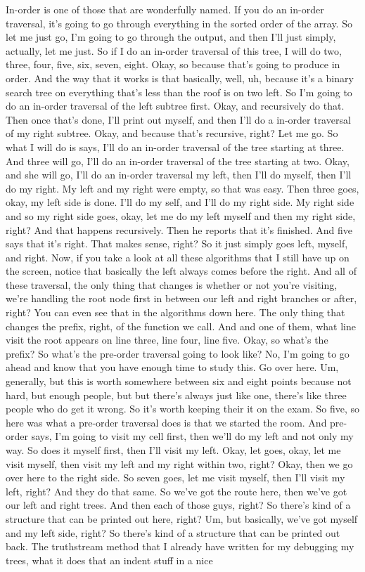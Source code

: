 In-order is one of those that are wonderfully named. If you do an in-order traversal, it's going to go through everything in the sorted order of the array. So let me just go, I'm going to go through the output, and then I'll just simply, actually, let me just. So if I do an in-order traversal of this tree, I will do two, three, four, five, six, seven, eight. Okay, so because that's going to produce in order. And the way that it works is that basically, well, uh, because it's a binary search tree on everything that's less than the roof is on two left. So I'm going to do an in-order traversal of the left subtree first. Okay, and recursively do that. Then once that's done, I'll print out myself, and then I'll do a in-order traversal of my right subtree. Okay, and because that's recursive, right? Let me go. So what I will do is says, I'll do an in-order traversal of the tree starting at three. And three will go, I'll do an in-order traversal of the tree starting at two. Okay, and she will go, I'll do an in-order traversal my left, then I'll do myself, then I'll do my right. My left and my right were empty, so that was easy. Then three goes, okay, my left side is done. I'll do my self, and I'll do my right side. My right side and so my right side goes, okay, let me do my left myself and then my right side, right? And that happens recursively. Then he reports that it's finished. And five says that it's right. That makes sense, right? So it just simply goes left, myself, and right. Now, if you take a look at all these algorithms that I still have up on the screen, notice that basically the left always comes before the right. And all of these traversal, the only thing that changes is whether or not you're visiting, we're handling the root node first in between our left and right branches or after, right? You can even see that in the algorithms down here. The only thing that changes the prefix, right, of the function we call. And and one of them, what line visit the root appears on line three, line four, line five. Okay, so what's the prefix? So what's the pre-order traversal going to look like? No, I'm going to go ahead and know that you have enough time to study this. Go over here. Um, generally, but this is worth somewhere between six and eight points because not hard, but enough people, but but there's always just like one, there's like three people who do get it wrong. So it's worth keeping their it on the exam. So five, so here was what a pre-order traversal does is that we started the room. And pre-order says, I'm going to visit my cell first, then we'll do my left and not only my way. So does it myself first, then I'll visit my left. Okay, let goes, okay, let me visit myself, then visit my left and my right within two, right? Okay, then we go over here to the right side. So seven goes, let me visit myself, then I'll visit my left, right? And they do that same. So we've got the route here, then we've got our left and right trees. And then each of those guys, right? So there's kind of a structure that can be printed out here, right? Um, but basically, we've got myself and my left side, right? So there's kind of a structure that can be printed out back. The truthstream method that I already have written for my debugging my trees, what it does that an indent stuff in a nice 